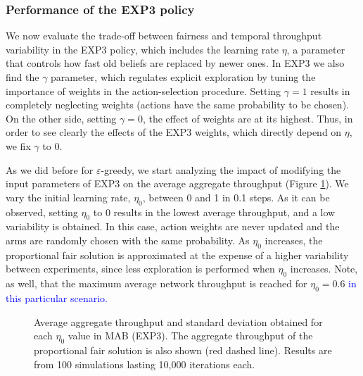 \documentclass[preprint,12pt]{elsarticle}
\newcommand{\francesc}[1]{\textcolor{blue}{#1}}
\begin{document}
\subsubsection{Performance of the EXP3 policy}
\label{section:exp3_study}
We now evaluate the trade-off between fairness and temporal throughput variability in the EXP3 policy, which includes the learning rate $\eta$, a parameter that controls how fast old beliefs are replaced by newer ones. In EXP3 we also find the $\gamma$ parameter, which regulates explicit exploration by tuning the importance of weights in the action-selection procedure. Setting $\gamma = 1$ results in completely neglecting weights (actions have the same probability to be chosen). On the other side, setting $\gamma = 0$, the effect of weights are  at its highest. Thus, in order to see clearly the effects of the EXP3 weights, which directly depend on $\eta$, we fix $\gamma$ to 0.

As we did before for $\varepsilon$-greedy, we start analyzing the impact of modifying the input parameters of EXP3 on the average aggregate throughput (Figure \ref{fig:exp3_tuning_parameters}). We vary the initial learning rate, $\eta_0$, between 0 and 1 in 0.1 steps. As it can be observed, setting $\eta_0$ to 0 results in the lowest average throughput, and a low variability is obtained. In this case, action weights are never updated and the arms are randomly chosen with the same probability. As $\eta_0$ increases, the proportional fair solution is approximated at the expense of a higher variability between experiments, since less exploration is performed when $\eta_0$ increases. Note, as well, that the maximum average network throughput is reached for $\eta_0 = 0.6$ \francesc{in this particular scenario.}

\begin{figure}[t!]
	\centering											
	\caption{Average aggregate throughput and standard deviation obtained for each $\eta_0$ value in MAB (EXP3). The aggregate throughput of the proportional fair solution is also shown (red dashed line). Results are from 100 simulations lasting 10,000 iterations each.}
	\label{fig:exp3_tuning_parameters}
\end{figure}	
\end{document}
